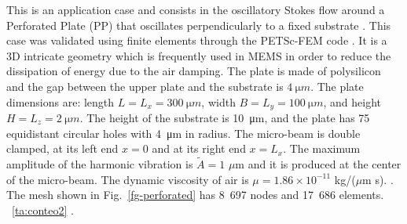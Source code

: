 \documentclass[oneside,onecolumn,10pt,final]{asme2ej}
\begin{document}
\noindent
This is an application case and consists in the oscillatory
Stokes flow around a Perforated Plate (PP) that oscillates
perpendicularly to a fixed substrate \cite{rf:xiao-ye-2011}. 
%
This case was validated using finite elements
through the PETSc-FEM code \cite{rf:paz3}.
%
It is a 3D intricate geometry which is frequently used in 
MEMS in order to reduce the dissipation of energy due to
the air damping.
%
The plate is made of polysilicon and the gap between 
the upper plate and the substrate is $\SI{4}{\micro m}$.
%
The plate dimensions are: 
length $L = L_x = \SI{300}{\micro m}$,
width  $B = L_y = \SI{100}{\micro m}$, and 
height $H = L_z = \SI{  2}{\micro m}$.
%
The height of the substrate is \SI{10}{\micro m}, 
and the plate has 75 equidistant circular holes 
with \SI{4}{\micro m} in radius.
%
The micro-beam is double clamped, at its left end $x=0$
and at its right end $x=L_x$.
%
The maximum amplitude of the harmonic vibration is
$\tilde A=1$ $\mu$m and it is produced at the
center of the micro-beam.  The dynamic viscosity of air
is $\mu=1.86 \times 10^{-11}$ kg/($\mu$m s).
%
. 
%
The mesh shown in Fig.~\ref{fg-perforated} 
has 8~697 nodes and 17~686 elements.
%
 ~\ref{ta:conteo2}
.
%
\end{document}
